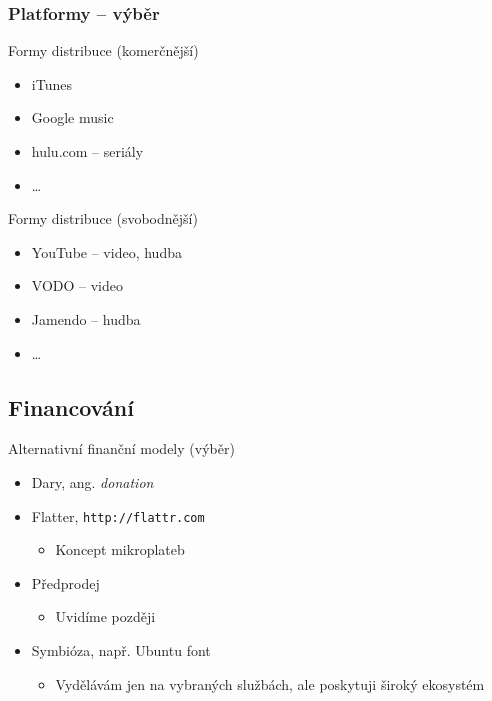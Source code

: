 \documentclass[xetex]{beamer}
\begin{document}
\begin{frame}
\frametitle{Platformy -- výběr}  

\begin{block}{Formy distribuce (komerčnější)}
  \begin{itemize}
    \item iTunes 
 	\item Google music
    \item hulu.com	-- seriály
	\item \ldots{}
  \end{itemize}
  \end{block}


\begin{block}{Formy distribuce (svobodnější)}
  \begin{itemize}
    \item YouTube -- video, hudba
 	\item VODO -- video
    \item Jamendo -- hudba
	\item \ldots{}
  \end{itemize}
  \end{block}
\end{frame}

\subsection{Financování}
\begin{frame}
 
 \begin{block}{Alternativní finanční modely (výběr)}
	   \begin{itemize}
	    \item Dary, ang. \emph{donation}
	    \item Flatter, \texttt{http://flattr.com}
			\begin{itemize}
				\item Koncept mikroplateb
			\end{itemize}
	    \item Předprodej
			\begin{itemize}
				\item Uvidíme později
			\end{itemize}
	    \item Symbióza, např. Ubuntu font
			\begin{itemize}
				\item Vydělávám jen na vybraných službách, ale poskytuji široký ekosystém
			\end{itemize}
   		\end{itemize}
  \end{block}
\end{frame}
\end{document}
